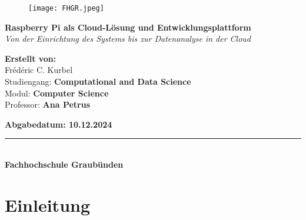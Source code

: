 \documentclass[a4paper,12pt]{article}
\begin{document}

\begin{figure}[t]
    \centering
    \texttt{[image: FHGR.jpeg]} %
\end{figure}

\vspace{2cm}

\begin{center}
    {\Huge \textbf{Raspberry Pi als Cloud-Lösung und Entwicklungsplattform}} \\[1.0em]
    {\Large \textit{Von der Einrichtung des Systems bis zur Datenanalyse in der Cloud}} \\
\end{center}

\vspace{3cm}

\begin{center}
    \textbf{Erstellt von:} \\[0.5em]
    {\Large Frédéric C. Kurbel} \\[1.5em]
    
    Studiengang: \textbf{Computational and Data Science} \\[1.5em]
    
    Modul: \textbf{Computer Science} \\[0.5em]
    Professor: \textbf{Ana Petrus} \\
\end{center}

\vspace{3cm}

\begin{center}
    \textbf{Abgabedatum: 10.12.2024} \\
\end{center}

\vfill

\begin{center}
    \rule{0.8\textwidth}{0.5pt} \\[0.5em]
    \textbf{Fachhochschule Graubünden}
\end{center}

\renewcommand{\contentsname}{Inhaltsverzeichnis}

\tableofcontents
\newpage

\section{Einleitung}
\end{document}
